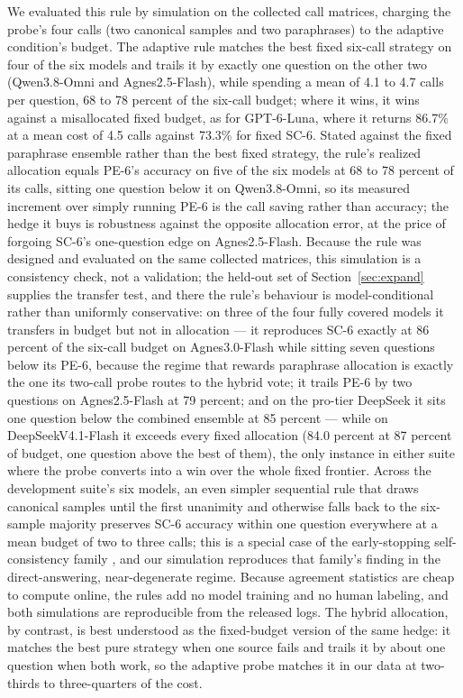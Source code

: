 We evaluated this rule by simulation on the collected call matrices, charging the probe's four calls (two canonical samples and two paraphrases) to the adaptive condition's budget. The adaptive rule matches the best fixed six-call strategy on four of the six models and trails it by exactly one question on the other two (Qwen3.8-Omni and Agnes2.5-Flash), while spending a mean of 4.1 to 4.7 calls per question, 68 to 78 percent of the six-call budget; where it wins, it wins against a misallocated fixed budget, as for GPT-6-Luna, where it returns 86.7\% at a mean cost of 4.5 calls against 73.3\% for fixed SC-6. Stated against the fixed paraphrase ensemble rather than the best fixed strategy, the rule's realized allocation equals PE-6's accuracy on five of the six models at 68 to 78 percent of its calls, sitting one question below it on Qwen3.8-Omni, so its measured increment over simply running PE-6 is the call saving rather than accuracy; the hedge it buys is robustness against the opposite allocation error, at the price of forgoing SC-6's one-question edge on Agnes2.5-Flash. Because the rule was designed and evaluated on the same collected matrices, this simulation is a consistency check, not a validation; the held-out set of Section~\ref{sec:expand} supplies the transfer test, and there the rule's behaviour is model-conditional rather than uniformly conservative: on three of the four fully covered models it transfers in budget but not in allocation --- it reproduces SC-6 exactly at 86 percent of the six-call budget on Agnes3.0-Flash while sitting seven questions below its PE-6, because the regime that rewards paraphrase allocation is exactly the one its two-call probe routes to the hybrid vote; it trails PE-6 by two questions on Agnes2.5-Flash at 79 percent; and on the pro-tier DeepSeek it sits one question below the combined ensemble at 85 percent --- while on DeepSeekV4.1-Flash it exceeds every fixed allocation (84.0 percent at 87 percent of budget, one question above the best of them), the only instance in either suite where the probe converts into a win over the whole fixed frontier. Across the development suite's six models, an even simpler sequential rule that draws canonical samples until the first unanimity and otherwise falls back to the six-sample majority preserves SC-6 accuracy within one question everywhere at a mean budget of two to three calls; this is a special case of the early-stopping self-consistency family \citep{aggarwal2023lets,li2024escape}, and our simulation reproduces that family's finding in the direct-answering, near-degenerate regime. Because agreement statistics are cheap to compute online, the rules add no model training and no human labeling, and both simulations are reproducible from the released logs. The hybrid allocation, by contrast, is best understood as the fixed-budget version of the same hedge: it matches the best pure strategy when one source fails and trails it by about one question when both work, so the adaptive probe matches it in our data at two-thirds to three-quarters of the cost.

